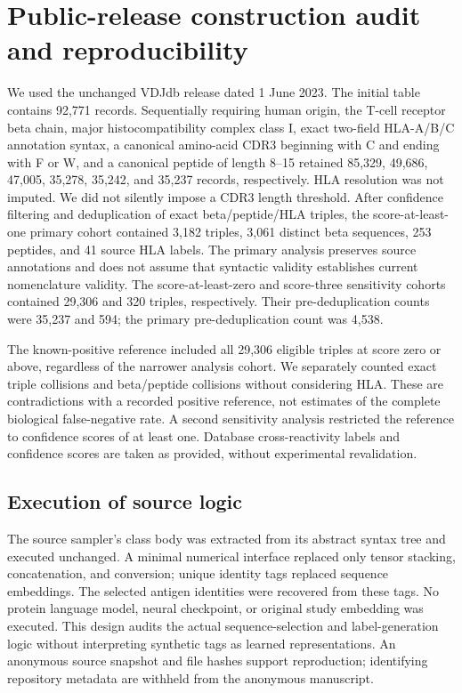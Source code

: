 \section{Public-release construction audit and reproducibility}
\label{supp:public-audit}

We used the unchanged VDJdb release dated 1 June 2023. The initial table contains
92,771 records. Sequentially requiring human origin, the T-cell receptor beta
chain, major histocompatibility complex class I, exact two-field HLA-A/B/C
annotation syntax, a canonical amino-acid CDR3 beginning with C and ending with F or W,
and a canonical peptide of length 8--15 retained 85,329, 49,686, 47,005, 35,278,
35,242, and 35,237 records, respectively. HLA resolution was not imputed. We did
not silently impose a CDR3 length threshold. After confidence filtering and
deduplication of exact beta/peptide/HLA triples, the score-at-least-one primary
cohort contained 3,182 triples, 3,061 distinct beta sequences, 253 peptides, and
41 source HLA labels. The primary analysis preserves source annotations and
does not assume that syntactic validity establishes current nomenclature
validity. The score-at-least-zero and score-three sensitivity cohorts
contained 29,306 and 320 triples, respectively. Their pre-deduplication counts
were 35,237 and 594; the primary pre-deduplication count was 4,538.

The known-positive reference included all 29,306 eligible triples at score zero
or above, regardless of the narrower analysis cohort. We separately counted
exact triple collisions and beta/peptide collisions without considering HLA.
These are contradictions with a recorded positive reference, not estimates of
the complete biological false-negative rate. A second sensitivity analysis
restricted the reference to confidence scores of at least one. Database
cross-reactivity labels and confidence scores are taken as provided, without
experimental revalidation.

\subsection{Execution of source logic}
The source sampler's class body was extracted from its abstract syntax tree and
executed unchanged. A minimal numerical interface replaced only tensor
stacking, concatenation, and conversion; unique identity tags replaced sequence
embeddings. The selected antigen identities were recovered from these tags.
No protein language model, neural checkpoint, or original study embedding was
executed. This design audits the actual sequence-selection and label-generation
logic without interpreting synthetic tags as learned representations. An
anonymous source snapshot and file hashes support reproduction; identifying
repository metadata are withheld from the anonymous manuscript.

